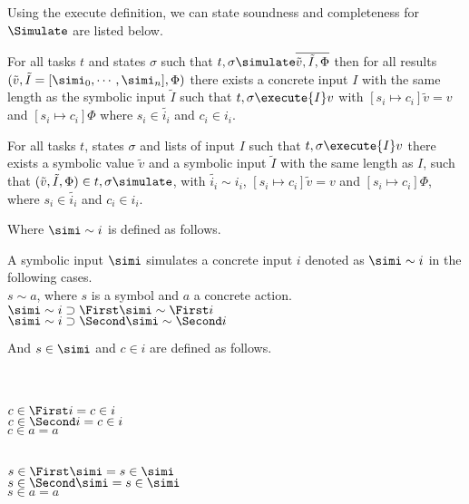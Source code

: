 Using the execute definition, we can state soundness and completeness for $\Simulate$ are listed below.

\begin{lemma}
  \label{lem:soundsimulate}
  For all tasks $t$ and states $\sigma$
  such that $t,\sigma\simulate\overline{\tilde{v},\tilde{I},\Phi}$
  then for all results $(\tilde{v},\tilde{I}=[\simi_0,\cdots,\simi_n],\Phi)$
  there exists a concrete input $I$ with the same length as the symbolic input $\tilde{I}$
  such that $t,\sigma\execute{I}v$
  with $[s_i\mapsto c_i]\tilde{v}=v$ and $[s_i\mapsto c_i]\Phi$
  where $s_i\in\tilde{i_i}$ and $c_i\in i_i$.
\end{lemma}

\begin{lemma}
  \label{lem:completesimulate}
  For all tasks $t$, states $\sigma$ and lists of input $I$
  such that $t,\sigma\execute{I}v$
  there exists a symbolic value $\tilde{v}$ and a symbolic input $\tilde{I}$ with the same length as $I$,
  such that $(\tilde{v},\tilde{I},\Phi)\in t,\sigma\simulate$,
  with $\tilde{i_i}\sim i_i$, $[s_i\mapsto c_i]\tilde{v}=v$ and $[s_i\mapsto c_i]\Phi$,
  where $s_i\in\tilde{i_i}$ and $c_i\in i_i$.
\end{lemma}

Where $\simi\sim i$ is defined as follows.

\begin{definition}
  A symbolic input $\simi$ simulates a concrete input $i$ denoted as $\simi\sim i$ in the following cases.\\
  $s\sim a$, where $s$ is a symbol and $a$ a concrete action.\\
  $\simi\sim i\implies \First \simi \sim \First i$\\
  $\simi\sim i\implies \Second \simi \sim \Second i$
\end{definition}

And $s\in \simi$ and $c\in i$ are defined as follows.\\
\\
\noindent
\begin{minipage}[c]{0.5\textwidth}
  \begin{definition}\\
    $c\in \First i = c\in i $\\
    $c\in \Second i = c\in i $\\
    $c\in a = a $
  \end{definition}
\end{minipage}
\begin{minipage}[c]{0.5\textwidth}
  \begin{definition}\\
    $s\in \First \simi = s\in \simi $\\
    $s\in \Second \simi = s\in \simi $\\
    $s\in a = a $
  \end{definition}
\end{minipage}\\
\\

